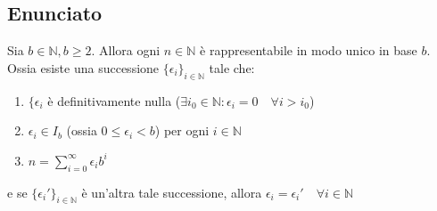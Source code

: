 \documentclass[a4paper,12pt]{article}
\begin{document}
\subsection*{Enunciato}
Sia $b \in \mathbb{N}, b \geq 2$. Allora ogni $n \in \mathbb{N}$ è rappresentabile in modo unico in base $b$. Ossia esiste una successione $\{\epsilon_{i}\}_{i \in \mathbb{N}}$ tale che:
\begin{enumerate}
	\item $\{\epsilon_{i}$ è definitivamente nulla ($\exists i_{0} \in \mathbb{N} : \epsilon_{i} = 0 \quad \forall i > i_{0}$)
	\item $\epsilon_{i} \in I_{b}$ (ossia $0 \leq \epsilon_{i} < b$) per ogni $i \in \mathbb{N}$
	\item $n = \sum_{i = 0}^{\infty} \epsilon_{i}b^i$
\end{enumerate}
e se $\{\epsilon_{i}'\}_{i \in \mathbb{N}}$ è un'altra tale successione, allora $\epsilon_{i} = \epsilon_{i}' \quad \forall i \in \mathbb{N}$
\end{document}
